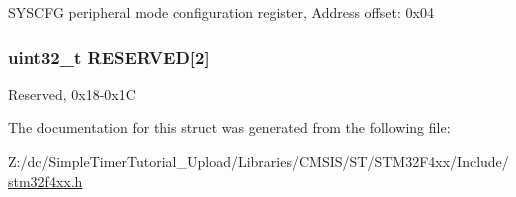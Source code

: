 S\-Y\-S\-C\-F\-G peripheral mode configuration register, Address offset\-: 0x04 \hypertarget{struct_s_y_s_c_f_g___type_def_afaf27b66c1edc60064db3fa6e693fb59}{
\subsubsection[{R\-E\-S\-E\-R\-V\-E\-D}]{\setlength{\rightskip}{0pt plus 5cm}uint32\-\_\-t R\-E\-S\-E\-R\-V\-E\-D\mbox{[}2\mbox{]}}}\label{struct_s_y_s_c_f_g___type_def_afaf27b66c1edc60064db3fa6e693fb59}
Reserved, 0x18-\/0x1\-C 

The documentation for this struct was generated from the following file\-:\begin{DoxyCompactItemize}
\item 
Z\-:/dc/\-Simple\-Timer\-Tutorial\-\_\-\-Upload/\-Libraries/\-C\-M\-S\-I\-S/\-S\-T/\-S\-T\-M32\-F4xx/\-Include/\hyperlink{stm32f4xx_8h}{stm32f4xx.\-h}\end{DoxyCompactItemize}

